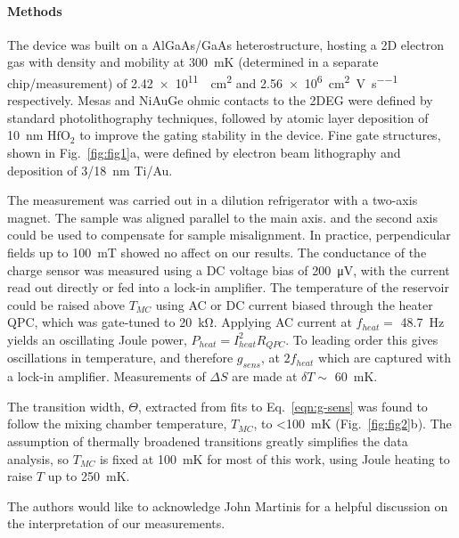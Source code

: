 \documentclass[twocolumn,showpacs,amsmath,amssymb,prl,aps,superscriptaddress]{revtex4-1}
\begin{document}
\paragraph*{Methods} The device was built on a AlGaAs/GaAs heterostructure, hosting a 2D electron gas with density and mobility at \SI{300}{\milli\kelvin} (determined in a separate chip/measurement) of \SI{2.42e11}{\per\square\centi\metre} and \SI[per-mode=symbol]{2.56e6}{\square\centi\metre\per\volt\per\second} respectively.   Mesas and NiAuGe ohmic contacts to the 2DEG were defined by standard photolithography techniques, followed by atomic layer deposition of \SI{10}{\nano\metre} $\mathrm{HfO_2}$ to improve the gating stability in the device. Fine gate structures, shown in Fig.~\ref{fig:fig1}a, were defined by electron beam lithography and deposition of \SI{3/18}{\nano\metre} Ti/Au. 

The measurement was carried out in a dilution refrigerator with a two-axis magnet. The sample was aligned parallel to the main axis. and the second axis could be used to compensate for sample misalignment. In practice, perpendicular fields up to \SI{100}{\milli\tesla} showed no affect on our results. The conductance of the charge sensor was measured using a DC voltage bias of \SI{200}{\micro\volt}, with the current read out directly or fed into a lock-in amplifier.  The temperature of the reservoir could be raised above $T_{MC}$ using AC or DC current biased through the heater QPC, which was gate-tuned to \SI{20}{\kilo\ohm}. Applying AC current at $f_{heat} =$ \SI{48.7}{\hertz} yields an oscillating Joule power, $P_{heat} = I^2_{heat}R_{QPC}$. To leading order this gives oscillations in temperature, and therefore $g_{sens}$, at $2f_{heat}$ which are captured with a lock-in amplifier. Measurements of $\Delta S$ are made at $\delta T \sim $ \SI{60}{\milli\kelvin}.

The transition width, $\Theta$, extracted from fits to Eq.~\ref{eqn:g-sens} was found to follow the mixing chamber temperature, $T_{MC}$, to \SI{<100}{\milli\kelvin} (Fig.~\ref{fig:fig2}b). The assumption of thermally broadened transitions greatly simplifies the data analysis, so $T_{MC}$ is fixed at \SI{100}{\milli\kelvin} for most of this work, using Joule heating to raise $T$ up to \SI{250}{\milli\kelvin}. 

\acknowledgments
The authors would like to acknowledge John Martinis for a helpful discussion on the interpretation of our measurements.

{}

\end{document}
